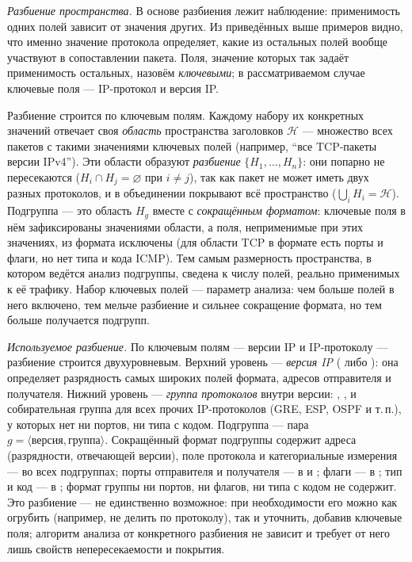 \emph{Разбиение пространства.} В основе разбиения лежит наблюдение: применимость одних полей зависит от значения других. Из приведённых выше примеров видно, что именно значение протокола определяет, какие из остальных полей вообще участвуют в сопоставлении пакета. Поля, значение которых так задаёт применимость остальных, назовём \emph{ключевыми}; в рассматриваемом случае ключевые поля --- IP-протокол и версия IP.

Разбиение строится по ключевым полям. Каждому набору их конкретных значений отвечает своя \emph{область} пространства заголовков $\mathcal{H}$ --- множество всех пакетов с такими значениями ключевых полей (например, ``все TCP-пакеты версии IPv4''). Эти области образуют \emph{разбиение} $\{H_1, \dots, H_n\}$: они попарно не пересекаются ($H_i \cap H_j = \varnothing$ при $i \neq j$), так как пакет не может иметь двух разных протоколов, и в объединении покрывают всё пространство ($\bigcup_i H_i = \mathcal{H}$). Подгруппа --- это область $H_g$ вместе с \emph{сокращённым форматом}: ключевые поля в нём зафиксированы значениями области, а поля, неприменимые при этих значениях, из формата исключены (для области TCP в формате есть порты и флаги, но нет типа и кода ICMP). Тем самым размерность пространства, в котором ведётся анализ подгруппы, сведена к числу полей, реально применимых к её трафику. Набор ключевых полей --- параметр анализа: чем больше полей в него включено, тем мельче разбиение и сильнее сокращение формата, но тем больше получается подгрупп.

\emph{Используемое разбиение.} По ключевым полям --- версии IP и IP-протоколу --- разбиение строится двухуровневым. Верхний уровень --- \emph{версия IP} ( либо ): она определяет разрядность самых широких полей формата, адресов отправителя и получателя. Нижний уровень --- \emph{группа протоколов} внутри версии: , ,  и собирательная группа  для всех прочих IP-протоколов (GRE, ESP, OSPF и т.\,п.), у которых нет ни портов, ни типа с кодом. Подгруппа --- пара $g = \langle\text{версия}, \text{группа}\rangle$. Сокращённый формат подгруппы содержит адреса (разрядности, отвечающей версии), поле протокола и категориальные измерения --- во всех подгруппах; порты отправителя и получателя --- в  и ; флаги --- в ; тип и код --- в ; формат группы  ни портов, ни флагов, ни типа с кодом не содержит. Это разбиение --- не единственно возможное: при необходимости его можно как огрубить (например, не делить по протоколу), так и уточнить, добавив ключевые поля; алгоритм анализа от конкретного разбиения не зависит и требует от него лишь свойств непересекаемости и покрытия.

